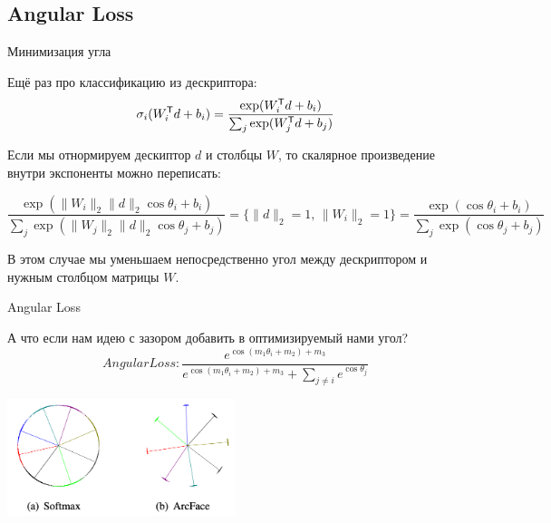 \subsection{Angular Loss}

\begin{frame}{Минимизация угла}

Ещё раз про классификацию из дескриптора:
\[
\sigma_i(W^{\mathsf{\scriptstyle T}}_i d + b_i) = \frac{\exp ( W^{\mathsf{\scriptstyle T}}_i d + b_i )}{\sum_j \exp ( W^{\mathsf{\scriptstyle T}}_j d + b_j )}
\]

Если мы отнормируем дескиптор $d$ и столбцы $W$, то скалярное произведение внутри экспоненты можно переписать:

\[
\frac{\exp ( \|W_i\|_2 \|d\|_2 \cos \theta_{i} + b_i )}{\sum_j \exp ( \|W_j\|_2 \|d\|_2 \cos \theta_{j} + b_j )} = \{ \|d\|_2 = 1,\, \|W_i\|_2 = 1 \} = 
\frac{\exp ( \cos \theta_{i} + b_i )}{\sum_j \exp ( \cos \theta_{j} + b_j )}
\]

В этом случае мы уменьшаем непосредственно угол между дескриптором и нужным столбцом матрицы $W$.
    
\end{frame}

\begin{frame}{Angular Loss}

А что если нам идею с зазором добавить в оптимизируемый нами угол?
\[
AngularLoss : \frac{e^{ \cos (m_1 \theta_{i} + m_2) + m_3} }{e^{ \cos (m_1 \theta_{i} + m_2) + m_3} + \sum_{j \neq i} e^{ \cos \theta_{j}} }
\]

\centering
\includegraphics[width=0.5\textwidth]{images/arcface.png}
    
\end{frame}

